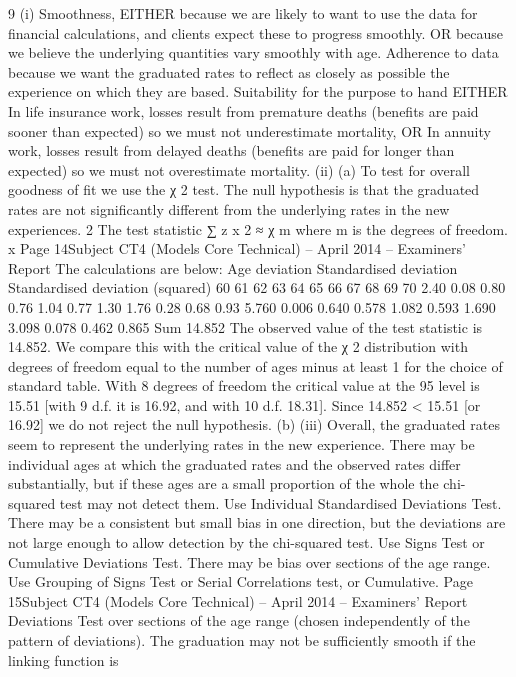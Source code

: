 \documentclass[a4paper,12pt]{article}
\begin{document}
\begin{enumerate}
9
(i)
Smoothness,
EITHER because we are likely to want to use the data for financial
calculations, and clients expect these to progress smoothly.
OR because we believe the underlying quantities vary smoothly with age.
Adherence to data
because we want the graduated rates to reflect as closely as possible the
experience on which they are based.
Suitability for the purpose to hand
EITHER In life insurance work, losses result from premature deaths
(benefits are paid sooner than expected) so we must not underestimate
mortality,
OR In annuity work, losses result from delayed deaths
(benefits are paid for longer than expected) so we must not overestimate
mortality.
(ii)
(a)
To test for overall goodness of fit we use the χ 2 test.
The null hypothesis is that the graduated rates are not significantly
different from the underlying rates in the new experiences.
2
The test statistic ∑ z x 2 ≈ χ m
where m is the degrees of freedom.
x
Page 14Subject CT4 (Models Core Technical) – April 2014 – Examiners’ Report
The calculations are below:
Age
deviation Standardised
deviation Standardised
deviation (squared)
60
61
62
63
64
65
66
67
68
69
70 2.40
0.08
0.80
0.76
1.04
0.77
1.30
1.76
0.28
0.68
0.93 5.760
0.006
0.640
0.578
1.082
0.593
1.690
3.098
0.078
0.462
0.865
Sum 14.852
The observed value of the test statistic is 14.852.
We compare this with the critical value of the χ 2 distribution with
degrees of freedom equal to the number of ages minus at least 1 for the
choice of standard table.
With 8 degrees of freedom the critical value at the 95%
level is 15.51 [with 9 d.f. it is 16.92, and with 10 d.f. 18.31].
Since 14.852 < 15.51 [or 16.92]
we do not reject the null hypothesis.
(b)
(iii)
Overall, the graduated rates seem to represent the underlying rates in
the new experience.
There may be individual ages at which the graduated rates and the observed
rates differ substantially, but if these ages are a small proportion of the whole
the chi-squared test may not detect them.
Use Individual Standardised Deviations Test.
There may be a consistent but small bias in one direction, but the deviations
are not large enough to allow detection by the chi-squared test.
Use Signs Test or Cumulative Deviations Test.
There may be bias over sections of the age range.
Use Grouping of Signs Test or Serial Correlations test, or Cumulative.
Page 15Subject CT4 (Models Core Technical) – April 2014 – Examiners’ Report
Deviations Test over sections of the age range (chosen independently of the
pattern of deviations).
The graduation may not be sufficiently smooth if the linking function is

\end{enumerate}
\end{document}
